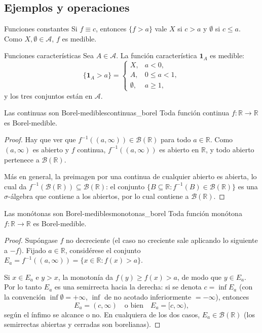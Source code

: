 \documentclass[11pt, a4paper]{article}
\begin{document}
\subsection{Ejemplos y operaciones}

\begin{ejemplo}{Funciones constantes}{}
Si $f \equiv c$, entonces $\{f > a\}$ vale $X$ si $c > a$ y $\emptyset$ si $c \le a$. Como
$X, \emptyset \in \mathcal{A}$, $f$ es medible.
\end{ejemplo}

\begin{ejemplo}{Funciones características}{}
Sea $A \in \mathcal{A}$. La función característica $\mathbf{1}_A$ es medible:
$$ \{\mathbf{1}_A > a\} = \begin{cases} X, & a < 0, \\ A, & 0 \le a < 1, \\ \emptyset,
& a \ge 1, \end{cases} $$
y los tres conjuntos están en $\mathcal{A}$.
\end{ejemplo}

\begin{teorema}{Las continuas son Borel-medibles}{continuas_borel}
Toda función continua $f: \mathbb{R} \to \mathbb{R}$ es Borel-medible.
\end{teorema}

\begin{proof}
Hay que ver que $f^{-1}((a, \infty)) \in \mathcal{B}(\mathbb{R})$ para todo $a \in \mathbb{R}$.
Como $(a, \infty)$ es abierto y $f$ continua, $f^{-1}((a, \infty))$ es abierto en $\mathbb{R}$, y
todo abierto pertenece a $\mathcal{B}(\mathbb{R})$.

Más en general, la preimagen por una continua de cualquier abierto es abierta, lo cual da
$f^{-1}(\mathcal{B}(\mathbb{R})) \subseteq \mathcal{B}(\mathbb{R})$: el conjunto $\{B \subseteq
\mathbb{R} : f^{-1}(B) \in \mathcal{B}(\mathbb{R})\}$ es una $\sigma$-álgebra que contiene a los
abiertos, por lo cual contiene a $\mathcal{B}(\mathbb{R})$.
\end{proof}

\begin{teorema}{Las monótonas son Borel-medibles}{monotonas_borel}
Toda función monótona $f: \mathbb{R} \to \mathbb{R}$ es Borel-medible.
\end{teorema}

\begin{proof}
Supóngase $f$ no decreciente (el caso no creciente sale aplicando lo siguiente a $-f$). Fijado
$a \in \mathbb{R}$, considérese el conjunto
$E_a = f^{-1}((a, \infty)) = \{x \in \mathbb{R} : f(x) > a\}$.

Si $x \in E_a$ e $y > x$, la monotonía da $f(y) \ge f(x) > a$, de modo que $y \in E_a$. Por lo
tanto $E_a$ es una semirrecta hacia la derecha: si se denota $c = \inf E_a$ (con la convención
$\inf \emptyset = +\infty$, $\inf$ de no acotado inferiormente $= -\infty$), entonces
$$ E_a = (c, \infty) \quad \text{o bien} \quad E_a = [c, \infty), $$
según el ínfimo se alcance o no. En cualquiera de los dos casos, $E_a \in
\mathcal{B}(\mathbb{R})$ (los semirrectas abiertas y cerradas son borelianas).
\end{proof}
\end{document}

